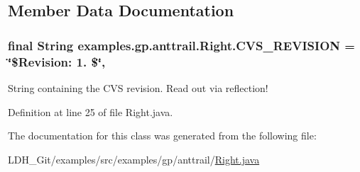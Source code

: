 \subsection{Member Data Documentation}
\hypertarget{classexamples_1_1gp_1_1anttrail_1_1_right_ac72fb11d200e28efed8f22acd8a23dc0}{
\subsubsection[{C\-V\-S\-\_\-\-R\-E\-V\-I\-S\-I\-O\-N}]{\setlength{\rightskip}{0pt plus 5cm}final String examples.\-gp.\-anttrail.\-Right.\-C\-V\-S\-\_\-\-R\-E\-V\-I\-S\-I\-O\-N = \char`\"{}\$Revision\-: 1. \$\char`\"{}\hspace{0.3cm}{\ttfamily [static]}, {\ttfamily [private]}}}\label{classexamples_1_1gp_1_1anttrail_1_1_right_ac72fb11d200e28efed8f22acd8a23dc0}
String containing the C\-V\-S revision. Read out via reflection! 

Definition at line 25 of file Right.\-java.



The documentation for this class was generated from the following file\-:\begin{DoxyCompactItemize}
\item 
L\-D\-H\-\_\-\-Git/examples/src/examples/gp/anttrail/\hyperlink{_right_8java}{Right.\-java}\end{DoxyCompactItemize}

